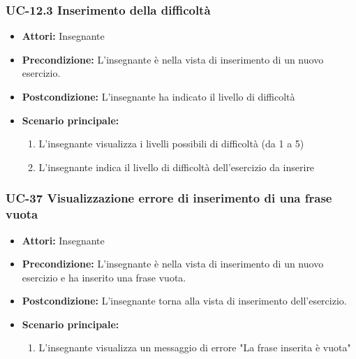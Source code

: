 \subsubsection{UC-12.3 Inserimento della difficoltà}
\begin{itemize}
	\item \textbf{Attori: }Insegnante
	\item \textbf{Precondizione:} L'insegnante è nella vista di inserimento di un nuovo esercizio.
	\item \textbf{Postcondizione:} L'insegnante ha indicato il livello di difficoltà
	\item \textbf{Scenario principale:}
	\begin{enumerate}
		\item L'insegnante visualizza i livelli possibili di difficoltà (da 1 a 5)
		\item L'insegnante indica il livello di difficoltà dell'esercizio da inserire
	\end{enumerate}
\end{itemize}

\subsubsection{UC-37 Visualizzazione errore di inserimento di una frase vuota}
\begin{itemize}
	\item \textbf{Attori:} Insegnante
	\item \textbf{Precondizione:} L'insegnante è nella vista di inserimento di un nuovo esercizio e ha inserito una frase vuota.
	\item \textbf{Postcondizione:} L'insegnante torna alla vista di inserimento dell'esercizio.
	\item \textbf{Scenario principale:}
	\begin{enumerate}
		\item L'insegnante visualizza un messaggio di errore "La frase inserita è vuota"
	\end{enumerate}
\end{itemize}

